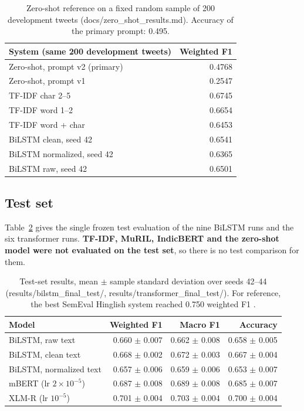 \begin{table}[h]
\centering
\begin{tabular}{lr}
\hline
System (same 200 development tweets) & Weighted F1 \\
\hline
Zero-shot, prompt v2 (primary) & 0.4768 \\
Zero-shot, prompt v1 & 0.2547 \\
TF-IDF char 2--5 & 0.6745 \\
TF-IDF word 1--2 & 0.6654 \\
TF-IDF word + char & 0.6453 \\
BiLSTM clean, seed 42 & 0.6541 \\
BiLSTM normalized, seed 42 & 0.6365 \\
BiLSTM raw, seed 42 & 0.6501 \\
\hline
\end{tabular}
\caption{Zero-shot reference on a fixed random sample of 200 development tweets (docs/zero\_shot\_results.md). Accuracy of the
primary prompt: 0.495.}
\label{tab:zs}
\end{table}

\subsection{Test set}
Table~\ref{tab:test} gives the single frozen test evaluation of the nine BiLSTM runs and the six transformer runs. \textbf{TF-IDF, MuRIL, IndicBERT and the zero-shot model were not evaluated on the test set}, so there is no test comparison for them.

\begin{table}[h]
\centering
\begin{tabular}{lrrr}
\hline
Model & Weighted F1 & Macro F1 & Accuracy \\
\hline
BiLSTM, raw text & 0.660 $\pm$ 0.007 & 0.662 $\pm$ 0.008 & 0.658 $\pm$ 0.005 \\
BiLSTM, clean text & 0.668 $\pm$ 0.002 & 0.672 $\pm$ 0.003 & 0.667 $\pm$ 0.004 \\
BiLSTM, normalized text & 0.657 $\pm$ 0.006 & 0.659 $\pm$ 0.006 & 0.653 $\pm$ 0.007 \\
mBERT (lr $2\times10^{-5}$) & 0.687 $\pm$ 0.008 & 0.689 $\pm$ 0.008 & 0.685 $\pm$ 0.007 \\
XLM-R (lr $10^{-5}$) & 0.701 $\pm$ 0.004 & 0.703 $\pm$ 0.004 & 0.700 $\pm$ 0.004 \\
\hline
\end{tabular}
\caption{Test-set results, mean $\pm$ sample standard deviation over seeds 42--44 (results/bilstm\_final\_test/, results/transformer\_final\_test/). For reference,
the best SemEval Hinglish system reached 0.750 weighted F1 \cite{patwa2020}.}
\label{tab:test}
\end{table}

